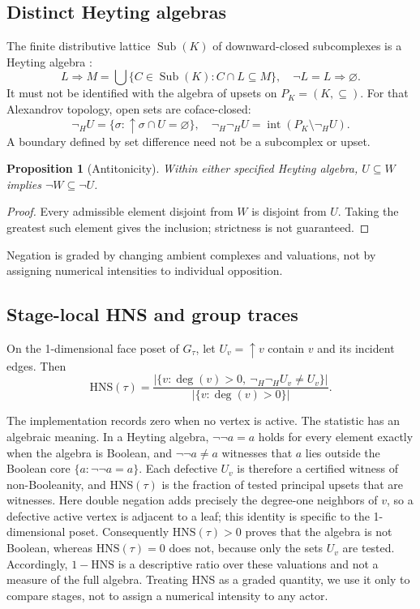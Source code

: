 \documentclass[a4paper,fleqn,oneside]{cas-sc}
\theoremstyle{definition}
\theoremstyle{plain}
\newtheorem{proposition}{Proposition}
\newcommand{\Sub}{\operatorname{Sub}}
\begin{document}
\subsection{Distinct Heyting algebras}\label{subsec:heyting}
The finite distributive lattice $\Sub(K)$ of downward-closed subcomplexes is a Heyting algebra \citep{Johnstone1982,Pourmoslemi2026Semantics}:
\begin{equation}
L\Rightarrow M=\bigcup\{C\in\Sub(K):C\cap L\subseteq M\},\quad \neg L=L\Rightarrow\varnothing.
\end{equation}
It must not be identified with the algebra of upsets on $P_K=(K,\subseteq)$. For that Alexandrov topology, open sets are coface-closed:
\begin{equation}
\neg_H U=\{\sigma:\uparrow\!\sigma\cap U=\varnothing\},\quad
\neg_H\neg_H U=\operatorname{int}(P_K\setminus\neg_H U).
\end{equation}
A boundary defined by set difference need not be a subcomplex or upset.
\begin{proposition}[Antitonicity]
Within either specified Heyting algebra, $U\subseteq W$ implies $\neg W\subseteq\neg U$.
\end{proposition}
\begin{proof}
Every admissible element disjoint from $W$ is disjoint from $U$. Taking the greatest such element gives the inclusion; strictness is not guaranteed.
\end{proof}
Negation is graded by changing ambient complexes and valuations, not by assigning numerical intensities to individual opposition.
\subsection{Stage-local HNS and group traces}\label{sec:hns}
On the 1-dimensional face poset of $G_\tau$, let $U_v=\uparrow\!v$ contain $v$ and its incident edges. Then
\begin{equation}
\text{HNS}(\tau)=\frac{|\{v:\deg(v)>0,\ \neg_H\neg_H U_v\ne U_v\}|}{|\{v:\deg(v)>0\}|}.
\end{equation}

The implementation records zero when no vertex is active. The statistic has an algebraic meaning. In a Heyting algebra, $\neg\neg a=a$ holds for every element exactly when the algebra is Boolean, and $\neg\neg a\ne a$ witnesses that $a$ lies outside the Boolean core $\{a:\neg\neg a=a\}$. Each defective $U_v$ is therefore a certified witness of non-Booleanity, and $\text{HNS}(\tau)$ is the fraction of tested principal upsets that are witnesses. Here double negation adds precisely the degree-one neighbors of $v$, so a defective active vertex is adjacent to a leaf; this identity is specific to the 1-dimensional poset. Consequently $\text{HNS}(\tau)>0$ proves that the algebra is not Boolean, whereas $\text{HNS}(\tau)=0$ does not, because only the sets $U_v$ are tested. Accordingly, $1-\text{HNS}$ is a descriptive ratio over these valuations and not a measure of the full algebra. Treating HNS as a graded quantity, we use it only to compare stages, not to assign a numerical intensity to any actor.
\end{document}
